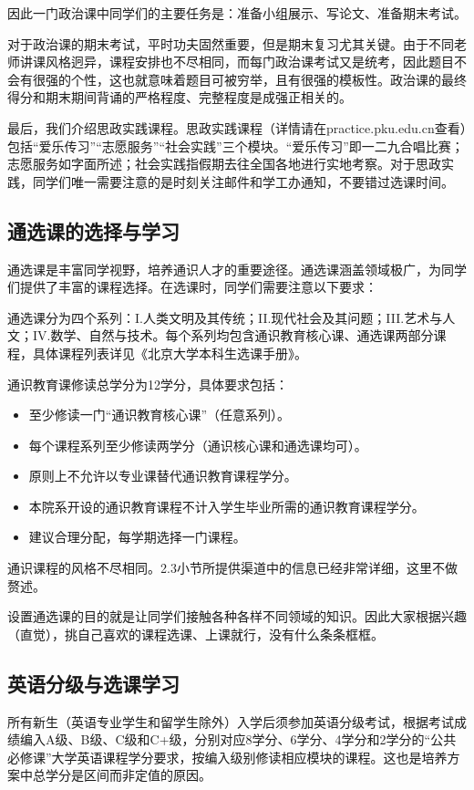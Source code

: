 \documentclass[11pt,oneside]{book}
\begin{document}
因此一门政治课中同学们的主要任务是：准备小组展示、写论文、准备期末考试。

对于政治课的期末考试，平时功夫固然重要，但是期末复习尤其关键。由于不同老师讲课风格迥异，课程安排也不尽相同，而每门政治课考试又是统考，因此题目不会有很强的个性，这也就意味着题目可被穷举，且有很强的模板性。政治课的最终得分和期末期间背诵的严格程度、完整程度是成强正相关的。

最后，我们介绍思政实践课程。思政实践课程（详情请在practice.pku.edu.cn查看）包括“爱乐传习”“志愿服务”“社会实践”三个模块。“爱乐传习”即一二九合唱比赛；志愿服务如字面所述；社会实践指假期去往全国各地进行实地考察。对于思政实践，同学们唯一需要注意的是时刻关注邮件和学工办通知，不要错过选课时间。

        \subsection{通选课的选择与学习}
        通选课是丰富同学视野，培养通识人才的重要途径。通选课涵盖领域极广，为同学们提供了丰富的课程选择。在选课时，同学们需要注意以下要求：
        
        通选课分为四个系列：I.人类文明及其传统；II.现代社会及其问题；III.艺术与人文；IV.数学、自然与技术。每个系列均包含通识教育核心课、通选课两部分课程，具体课程列表详见《北京大学本科生选课手册》。
       
        通识教育课修读总学分为12学分，具体要求包括：
        \begin{itemize}
            \item 至少修读一门“通识教育核心课”（任意系列）。
            \item 每个课程系列至少修读两学分（通识核心课和通选课均可）。
            \item 原则上不允许以专业课替代通识教育课程学分。
            \item 本院系开设的通识教育课程不计入学生毕业所需的通识教育课程学分。
            \item 建议合理分配，每学期选择一门课程。

        \end{itemize}
        
        通识课程的风格不尽相同。2.3小节所提供渠道中的信息已经非常详细，这里不做赘述。
        
设置通选课的目的就是让同学们接触各种各样不同领域的知识。因此大家根据兴趣（直觉），挑自己喜欢的课程选课、上课就行，没有什么条条框框。
        \subsection{英语分级与选课学习}
所有新生（英语专业学生和留学生除外）入学后须参加英语分级考试，根据考试成绩编入A级、B级、C级和C+级，分别对应8学分、6学分、4学分和2学分的“公共必修课”大学英语课程学分要求，按编入级别修读相应模块的课程。这也是培养方案中总学分是区间而非定值的原因。
\end{document}
